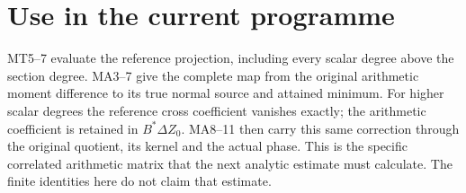 \documentclass[11pt]{article}
\begin{document}
\section{Use in the current programme}
MT5--7 evaluate the reference projection, including every scalar
degree above the section degree. MA3--7 give the complete map from
the original arithmetic moment difference to its true normal source
and attained minimum. For higher scalar degrees the reference cross
coefficient vanishes exactly; the arithmetic coefficient is retained
in $B^*\Delta Z_0$. MA8--11 then carry this same correction through
the original quotient, its kernel and the actual phase. This is the
specific correlated arithmetic matrix that the next analytic estimate
must calculate. The finite identities here do not claim that estimate.
\end{document}
